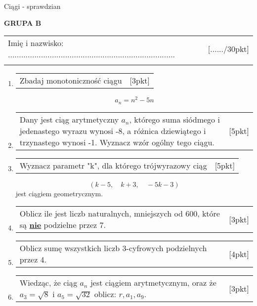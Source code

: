 \documentclass[12pt,a4paper]{article}
\begin{document}
	\begin{center}
	\LARGE Ciągi - sprawdzian
\end{center}
\vspace{1.5cm}
\begin{flushright}
	\textbf{GRUPA B}
\end{flushright}
\begin{tabular}{p{13cm} r}
	Imię i nazwisko: ............................................................................
	&[....../30pkt]\\ 
	\vspace{0.5cm}
\end{tabular}
\begin{enumerate}[1.]
	\item  \begin{tabular}{p{13cm} r}
		Zbadaj monotoniczność ciągu  &[3pkt]\\ 
	\end{tabular}
	$$a_n= n^2 - 5n$$
	
	\item  \begin{tabular}{p{13cm} r}
		Dany jest ciąg arytmetyczny $a_n$, którego suma siódmego i jedenastego wyrazu wynosi -8, a różnica dziewiątego i trzynastego wynosi -1. Wyznacz wzór ogólny tego ciągu. 
		&[5pkt]\\ 
	\end{tabular}
	
	\item \begin{tabular}{p{13cm} r}
		Wyznacz parametr "k", dla którego trójwyrazowy ciąg
		&[5pkt]\\
	\end{tabular}
	$$(k-5,\quad k+3, \quad -5k-3)$$
	jest ciągiem geometrycznym. 
	
	\item \begin{tabular}{p{13cm} r}
		Oblicz ile jest liczb naturalnych, mniejszych od 600, które są \textbf{\underline{nie}} podzielne przez 7.&[3pkt]\\ 
	\end{tabular}
	
	\item \begin{tabular}{p{13cm} r}
		Oblicz sumę wszystkich liczb 3-cyfrowych podzielnych przez 4.&[4pkt]\\ 
	\end{tabular}
	
	\item \begin{tabular}{p{13cm} r}
		Wiedząc, że ciąg $a_n$ jest ciągiem arytmetycznym, oraz że $a_3=\sqrt{8}$ i $a_5=\sqrt{32}$ oblicz: $r,a_1,a_9$. &[3pkt]\\ 
	\end{tabular}
	

\end{enumerate}
\end{document}
